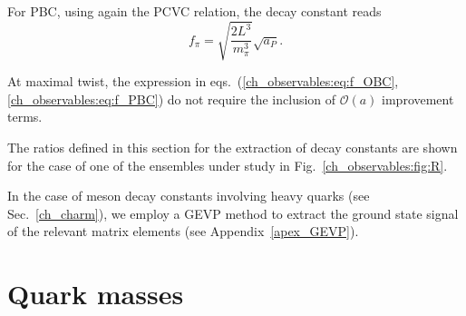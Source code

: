 For PBC, using again the PCVC relation, the decay constant reads
\begin{equation}
\label{ch_observables:eq:f_PBC}
f_{\pi}=\sqrt{\frac{2L^3}{m_{\pi}^3}}\sqrt{a_P}.
\end{equation}

At maximal twist, the expression in eqs.~(\ref{ch_observables:eq:f_OBC},\ref{ch_observables:eq:f_PBC}) do not require the inclusion of $\mathcal{O}(a)$ improvement terms.

The ratios defined in this section for the extraction of decay constants are shown for the case of one of the ensembles under study in Fig.~\ref{ch_observables:fig:R}.

In the case of meson decay constants involving heavy quarks (see Sec.~\ref{ch_charm}), we employ a GEVP method to extract the ground state signal of the relevant matrix elements (see Appendix~\ref{apex_GEVP}).


\section{Quark masses}
\label{ch_observables:sec:quark_mass}

